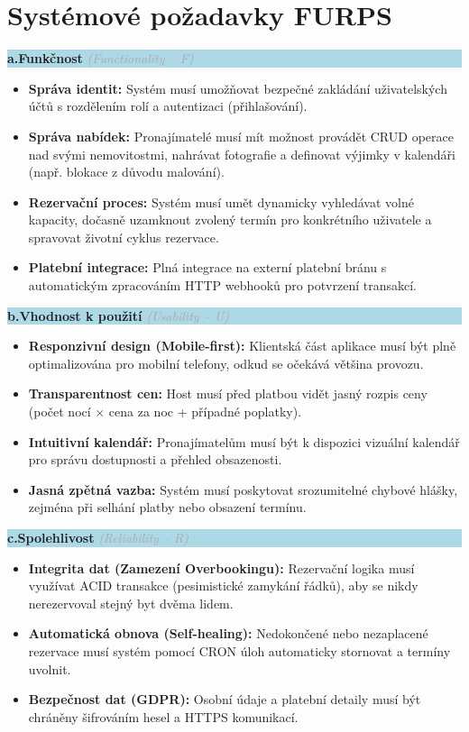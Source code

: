 \documentclass[11pt, a4paper]{article}
\newcommand{\furpssec}[2]{%
  \vspace{0.45cm}%
  \noindent\colorbox{lightblue}{%
    \parbox{\dimexpr\textwidth-2\fboxsep\relax}{%
      \vspace{3pt}\hspace{4pt}%
      \textbf{\textcolor{mainblue}{#1}}\enskip%
      {\small\textcolor{darkgray}{\textit{(#2)}}}%
      \hspace{4pt}\vspace{3pt}%
    }%
  }\par\vspace{0.25cm}%
}
\begin{document}
\section{Systémové požadavky FURPS}

\furpssec{a.\enspace Funkčnost}{Functionality -- F}
\begin{itemize}
  \item \textbf{Správa identit:} Systém musí umožňovat bezpečné zakládání uživatelských účtů s rozdělením rolí a autentizaci (přihlašování).
  \item \textbf{Správa nabídek:} Pronajímatelé musí mít možnost provádět CRUD operace nad svými nemovitostmi, nahrávat fotografie a definovat výjimky v kalendáři (např. blokace z důvodu malování).
  \item \textbf{Rezervační proces:} Systém musí umět dynamicky vyhledávat volné kapacity, dočasně uzamknout zvolený termín pro konkrétního uživatele a spravovat životní cyklus rezervace.
  \item \textbf{Platební integrace:} Plná integrace na externí platební bránu s automatickým zpracováním HTTP webhooků pro potvrzení transakcí.
\end{itemize}

\furpssec{b.\enspace Vhodnost k použití}{Usability -- U}
\begin{itemize}
  \item \textbf{Responzivní design (Mobile-first):} Klientská část aplikace musí být plně optimalizována pro mobilní telefony, odkud se očekává většina provozu.
  \item \textbf{Transparentnost cen:} Host musí před platbou vidět jasný rozpis ceny (počet nocí $\times$ cena za noc + případné poplatky).
  \item \textbf{Intuitivní kalendář:} Pronajímatelům musí být k dispozici vizuální kalendář pro správu dostupnosti a přehled obsazenosti.
  \item \textbf{Jasná zpětná vazba:} Systém musí poskytovat srozumitelné chybové hlášky, zejména při selhání platby nebo obsazení termínu.
\end{itemize}

\furpssec{c.\enspace Spolehlivost}{Reliability -- R}
\begin{itemize}
  \item \textbf{Integrita dat (Zamezení Overbookingu):} Rezervační logika musí využívat ACID transakce (pesimistické zamykání řádků), aby se nikdy nerezervoval stejný byt dvěma lidem.
  \item \textbf{Automatická obnova (Self-healing):} Nedokončené nebo nezaplacené rezervace musí systém pomocí CRON úloh automaticky stornovat a termíny uvolnit.
  \item \textbf{Bezpečnost dat (GDPR):} Osobní údaje a platební detaily musí být chráněny šifrováním hesel a HTTPS komunikací.
\end{itemize}
\end{document}
